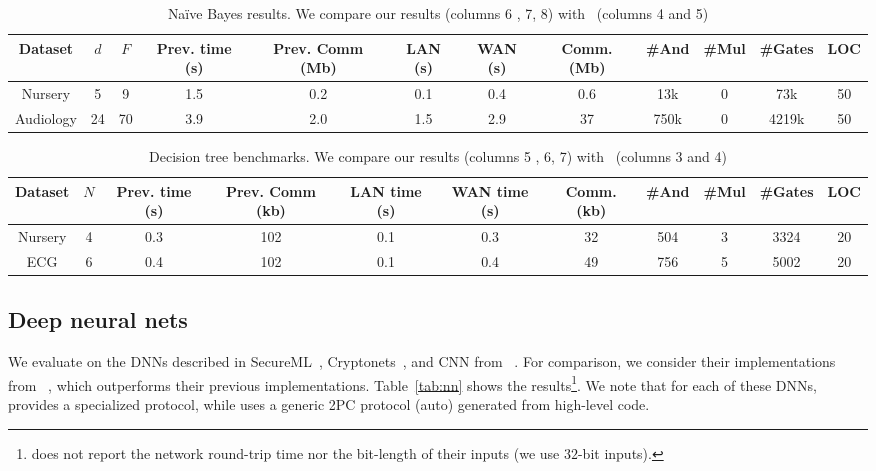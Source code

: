 \begin{table*}
\begin{tabular}{c|c|c|c|c|c |c|c|c|c|c|c}
Dataset & $d$ & $F$ & Prev. time (s) & Prev. Comm (Mb) & LAN (s) & WAN (s) & Comm. (Mb)  & \#And & \#Mul & \#Gates  & LOC\\
\hline
Nursery & 5 & 9 & 1.5 & 0.2 & 0.1 & 0.4 & 0.6 & 13k & 0 & 73k & 50\\
\hline
Audiology & 24 & 70 & 3.9 & 2.0 & 1.5 & 2.9 & 37 & 750k & 0 & 4219k & 50\\
\hline
\end{tabular}

 \caption{Na\"{i}ve Bayes results. We compare our results (columns 6 , 7, 8) with~\cite{shafindss} (columns 4 and 5)}
 \label{tab:nb} 
\end{table*}

\begin{table*}
\begin{tabular}{c|c|c|c |c|c|c|c|c|c|c}
Dataset  & $N$ & Prev. time (s) & Prev. Comm (kb) & LAN time (s) & WAN time (s) & Comm. (kb)  & \#And & \#Mul & \#Gates & LOC\\
\hline
Nursery & 4 & 0.3 & 102 & 0.1 & 0.3 & 32 & 504 & 3 & 3324 & 20\\
\hline
ECG &  6 & 0.4 & 102 & 0.1 & 0.4 & 49 & 756 & 5 & 5002 & 20\\
\hline
\end{tabular}

 \caption{Decision tree benchmarks. We compare our results (columns 5 , 6, 7) with~\cite{wu} (columns 3 and 4)}
 \label{tab:dt} 
\end{table*}



\subsection{Deep neural nets}
\label{sec:dnneval}
We evaluate \tool on the DNNs described in SecureML~\cite{secureml},
Cryptonets~\cite{cryptonets}, and CNN from \minion~\cite{minionn}. For
comparison, we consider their implementations from
\minion~\cite{minionn}, which outperforms their previous
implementations. Table~\ref{tab:nn} shows the
results\footnote{\minion does not report the network round-trip time nor the bit-length of their inputs (we use $32$-bit inputs).}.
We note that for each of these DNNs, \minion provides a
specialized protocol, while \tool uses a generic 2PC protocol
(auto) generated from high-level code.

